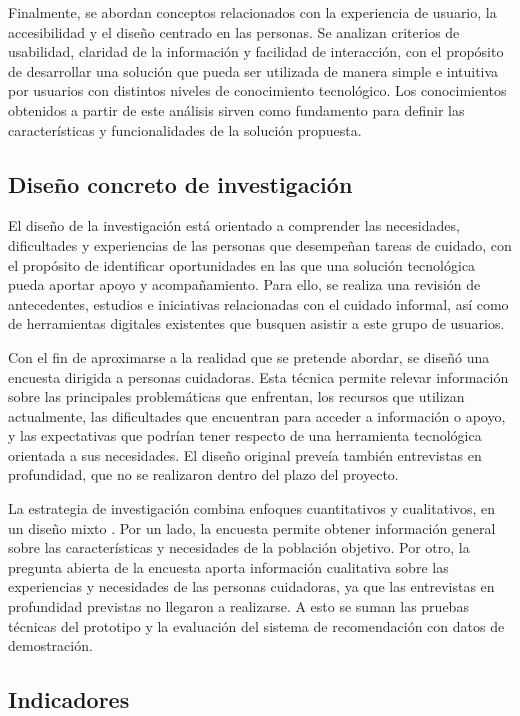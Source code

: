 Finalmente, se abordan conceptos relacionados con la experiencia de usuario, la accesibilidad y el diseño centrado en las personas. Se analizan criterios de usabilidad, claridad de la información y facilidad de interacción, con el propósito de desarrollar una solución que pueda ser utilizada de manera simple e intuitiva por usuarios con distintos niveles de conocimiento tecnológico. Los conocimientos obtenidos a partir de este análisis sirven como fundamento para definir las características y funcionalidades de la solución propuesta.

\subsection{Diseño concreto de investigación}

El diseño de la investigación está orientado a comprender las necesidades, dificultades y experiencias de las personas que desempeñan tareas de cuidado, con el propósito de identificar oportunidades en las que una solución tecnológica pueda aportar apoyo y acompañamiento. Para ello, se realiza una revisión de antecedentes, estudios e iniciativas relacionadas con el cuidado informal, así como de herramientas digitales existentes que busquen asistir a este grupo de usuarios.

Con el fin de aproximarse a la realidad que se pretende abordar, se diseñó una encuesta dirigida a personas cuidadoras. Esta técnica permite relevar información sobre las principales problemáticas que enfrentan, los recursos que utilizan actualmente, las dificultades que encuentran para acceder a información o apoyo, y las expectativas que podrían tener respecto de una herramienta tecnológica orientada a sus necesidades. El diseño original preveía también entrevistas en profundidad, que no se realizaron dentro del plazo del proyecto.

La estrategia de investigación combina enfoques cuantitativos y cualitativos, en un diseño mixto \citep{hernandezsampieri2014}. Por un lado, la encuesta permite obtener información general sobre las características y necesidades de la población objetivo. Por otro, la pregunta abierta de la encuesta aporta información cualitativa sobre las experiencias y necesidades de las personas cuidadoras, ya que las entrevistas en profundidad previstas no llegaron a realizarse. A esto se suman las pruebas técnicas del prototipo y la evaluación del sistema de recomendación con datos de demostración.

\subsection{Indicadores}

